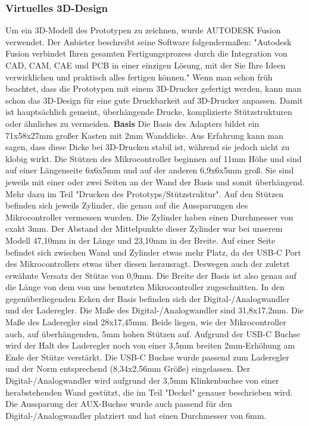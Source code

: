 \documentclass[]{article}
\begin{document}
\subsubsection{Virtuelles 3D-Design}
Um ein 3D-Modell des Prototypen zu zeichnen, wurde AUTODESK Fusion verwendet. Der Anbieter beschreibt seine Software folgendermaßen: "Autodesk Fusion verbindet Ihren gesamten Fertigungsprozess durch die Integration von CAD, CAM, CAE und PCB in einer einzigen Lösung, mit der Sie Ihre Ideen verwirklichen und praktisch alles fertigen können."\newline
Wenn man schon früh beachtet, dass die Prototypen mit einem 3D-Drucker gefertigt werden, kann man schon das 3D-Design für eine gute Druckbarkeit auf 3D-Drucker anpassen. Damit ist hauptsächlich gemeint, überhängende Drucke, komplizierte Stützstrukturen oder ähnliches zu vermeiden.
\vspace{4mm}\newline
\textbf{Basis} \newline
Die Basis des Adapters bildet ein 71x58x27mm großer Kasten mit 2mm Wanddicke. Aus Erfahrung kann man sagen, dass diese Dicke bei 3D-Drucken stabil ist, während sie jedoch nicht zu klobig wirkt.\newline
Die Stützen des Mikrocontroller beginnen auf 11mm Höhe und sind auf einer Längenseite 6x6x5mm und auf der anderen 6,9x6x5mm groß. Sie sind jeweils mit einer oder zwei Seiten an der Wand der Basis und somit überhängend. Mehr dazu im Teil "Drucken des Prototyps/Stützstruktur".\newline
Auf den Stützen befinden sich jeweils Zylinder, die genau auf die Aussparungen des Mikrocontroller vermessen wurden. Die Zylinder haben einen Durchmesser von exakt 3mm. Der Abstand der Mittelpunkte dieser Zylinder war bei unserem Modell 47,10mm in der Länge und 23,10mm in der Breite. Auf einer Seite befindet sich zwischen Wand und Zylinder etwas mehr Platz, da der USB-C Port des Mikrocontrollers etwas über diesen herausragt. Deswegen auch der zuletzt erwähnte Versatz der Stütze von 0,9mm.\newline
Die Breite der Basis ist also genau auf die Länge von dem von uns benutzten Mikrocontroller zugeschnitten.\newline
In den gegenüberliegenden Ecken der Basis befinden sich der Digital-/Analogwandler und der Laderegler. Die Maße des Digital-/Analogwandler sind 31,8x17,2mm. Die Maße des Laderegler sind 28x17,45mm. Beide liegen, wie der Mikrocontroller auch, auf überhängenden, 5mm hohen Stützen auf. Aufgrund der USB-C Buchse wird der Halt des Laderegler noch von einer 3,5mm breiten 2mm-Erhöhung am Ende der Stütze verstärkt. Die USB-C Buchse wurde passend zum Laderegler und der Norm entsprechend (8,34x2,56mm Größe) eingelassen. Der Digital-/Analogwandler wird aufgrund der 3,5mm Klinkenbuchse von einer herabstehenden Wand gestützt, die im Teil "Deckel" genauer beschrieben wird. Die Aussparung der AUX-Buchse wurde auch passend für den Digital-/Analogwandler platziert und hat einen Durchmesser von 6mm.
\end{document}
